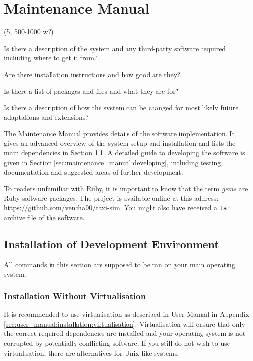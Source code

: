 \newpage
\section{Maintenance Manual}
\label{sec:maintenance_manual}

(5, 500-1000 w?)

Is there a description of the system and any third-party software required
including where to get it from?

Are there installation instructions and how good are they?

Is there a list of packages and files and what they are for?

Is there a description of how the system can be changed for most likely future
adaptations and extensions?


The Maintenance Manual provides details of the software implementation. It
gives an advanced overview of the system setup and installation and lists the
main dependencies in Section \ref{sec:maintenance_manual:installation}. A
detailed guide to developing the software is given in Section
\ref{sec:maintenance_manual:developing}, including testing, documentation and
suggested areas of further development.


 To readers unfamiliar with Ruby, it is important to know that the term
\textit{gems} are Ruby software packages. The project is available online at
this address: \url{https://github.com/vencha90/taxi-sim}. You might also have
received a \texttt{tar} archive file of the software.

\subsection{Installation of Development Environment}
\label{sec:maintenance_manual:installation}

All commands in this section are supposed to be ran on your main operating
system.


\subsubsection{Installation Without Virtualisation}
\label{sec:maintenance_manual:native_install}

It is recommended to use virtualisation as described in User Manual in Appendix
\ref{sec:user_manual:installation:virtualisation}. Virtualisation will ensure
that only the correct required dependencies are installed and your operating
system is not corrupted by potentially conflicting software. If you still do
not wish to use virtualisation, there are alternatives for Unix-like systems.

